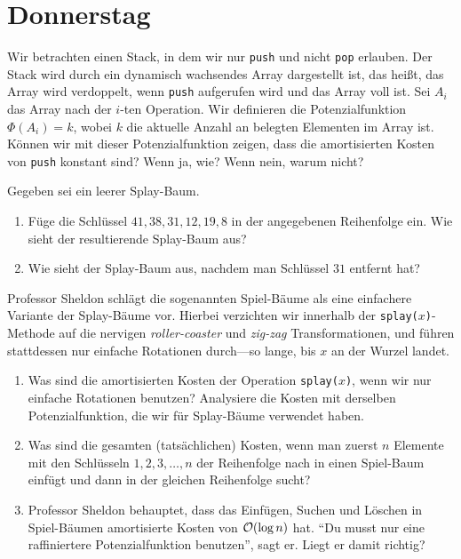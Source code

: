 \documentclass{uebung_cs}
\begin{document}
\section*{Donnerstag}
\begin{exercise}
    Wir betrachten einen Stack, in dem wir nur \texttt{push} und nicht \texttt{pop} erlauben. Der Stack wird durch ein dynamisch wachsendes Array dargestellt ist, das heißt, das Array wird verdoppelt, wenn \texttt{push} aufgerufen wird und das Array voll ist.
    Sei $A_i$ das Array nach der $i$-ten Operation.
    Wir definieren die Potenzialfunktion $\Phi(A_i) = k$, wobei $k$ die aktuelle Anzahl an belegten Elementen im Array ist.
    Können wir mit dieser Potenzialfunktion zeigen, dass die amortisierten Kosten von \texttt{push} konstant sind? Wenn ja, wie? Wenn nein, warum nicht?
\end{exercise}

\begin{exercise}
    Gegeben sei ein leerer Splay-Baum.
    \begin{enumerate}
        \item Füge die Schlüssel $41,38,31,12,19,8$ in der angegebenen Reihenfolge ein. Wie sieht der resultierende Splay-Baum aus?
        \item Wie sieht der Splay-Baum aus, nachdem man Schlüssel $31$ entfernt hat?
    \end{enumerate}
\end{exercise}
\begin{exercise}
    Professor Sheldon schlägt die sogenannten Spiel-Bäume als eine einfachere Variante der Splay-Bäume vor. Hierbei verzichten wir innerhalb der \texttt{splay($x$)}-Methode auf die nervigen \emph{roller-coaster} und \emph{zig-zag} Transformationen, und führen stattdessen nur einfache Rotationen durch---so lange, bis $x$ an der Wurzel landet.
    \begin{enumerate}
        \item{}\athome\mittel Was sind die amortisierten Kosten der Operation \texttt{splay($x$)}, wenn wir nur einfache Rotationen benutzen? Analysiere die Kosten mit derselben Potenzialfunktion, die wir für Splay-Bäume verwendet haben.
        \item{}\athome\mittel Was sind die gesamten (tatsächlichen) Kosten, wenn man zuerst $n$ Elemente mit den Schlüsseln $1,2,3,\dots,n$ der Reihenfolge nach in einen Spiel-Baum einfügt und dann in der gleichen Reihenfolge sucht?
        \item{}\atschool\note Professor Sheldon behauptet, dass das Einfügen, Suchen und Löschen in Spiel-Bäumen amortisierte Kosten von $\mathcal{O}(\log n)$ hat. \enquote{Du musst nur eine raffiniertere Potenzialfunktion benutzen}, sagt er. Liegt er damit richtig?
    \end{enumerate}
\end{exercise}
\end{document}

